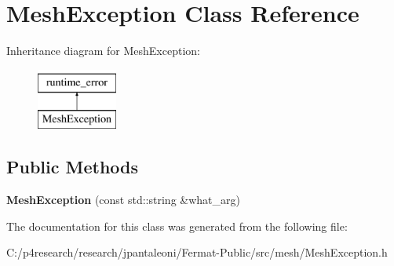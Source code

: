 \hypertarget{class_mesh_exception}{}\section{Mesh\+Exception Class Reference}
\label{class_mesh_exception}
Inheritance diagram for Mesh\+Exception\+:\begin{figure}[H]
\begin{center}
\leavevmode
\includegraphics[height=2.000000cm]{class_mesh_exception}
\end{center}
\end{figure}
\subsection*{Public Methods}
\begin{DoxyCompactItemize}
\item 
\mbox{\label{class_mesh_exception_a73768a8610ce6401dee99603f1ca0666}} 
{\bfseries Mesh\+Exception} (const std\+::string \&what\+\_\+arg)
\end{DoxyCompactItemize}


The documentation for this class was generated from the following file\+:\begin{DoxyCompactItemize}
\item 
C\+:/p4research/research/jpantaleoni/\+Fermat-\/\+Public/src/mesh/Mesh\+Exception.\+h\end{DoxyCompactItemize}
